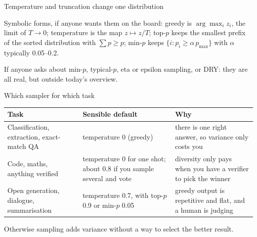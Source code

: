 \documentclass[aspectratio=169,10pt]{beamer}
\begin{document}
\begin{frame}{Temperature and truncation change one distribution}
{  Symbolic forms, if anyone wants them on the board: greedy is $\arg\max_i z_i$,
  the limit of $T\to 0$; temperature is the map $z \mapsto z/T$; top-$p$ keeps
  the smallest prefix of the sorted distribution with $\sum p \ge p$; min-$p$
  keeps $\{i : p_i \ge \alpha\, p_{\max}\}$ with $\alpha$ typically 0.05--0.2.

  If anyone asks about min-$p$, typical-$p$, eta or epsilon sampling, or DRY:
  they are all real, but outside today's overview.}
\end{frame}

\begin{frame}{Which sampler for which task}
  \centering
  \small
  \begin{tabular}{@{}L{3.3cm} L{3.4cm} L{4.6cm}@{}}
    \toprule
    \textbf{Task} & \textbf{Sensible default} & \textbf{Why}\\
    \midrule
    Classification, extraction, exact-match QA &
      temperature 0 (greedy) &
      there is one right answer, so variance only costs you\\[0.3em]
    Code, maths, anything verified &
      temperature 0 for one shot; about 0.8 if you sample several and vote &
      diversity only pays when you have a verifier to pick the winner\\[0.3em]
    Open generation, dialogue, summarisation &
      temperature 0.7, with top-$p$ 0.9 or min-$p$ 0.05 &
      greedy output is repetitive and flat, and a human is judging\\[0.3em]
    \bottomrule
  \end{tabular}

  \vspace{0.5em}
  \raggedright
   Otherwise sampling adds variance without a way to select the
  better result.
\end{frame}
\end{document}
